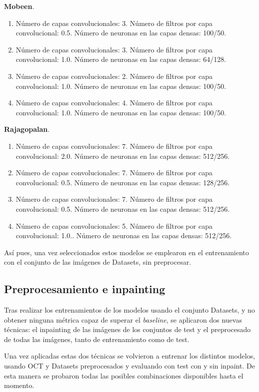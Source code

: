 \textbf{Mobeen}.
\begin{enumerate}
    \item Número de capas convolucionales: 3. Número de filtros por capa convolucional: 0.5. Número de neuronas en las capas densas: 100/50.
    \item Número de capas convolucionales: 3. Número de filtros por capa convolucional: 1.0. Número de neuronas en las capas densas: 64/128.
    \item Número de capas convolucionales: 2. Número de filtros por capa convolucional: 1.0. Número de neuronas en las capas densas: 100/50.
    \item Número de capas convolucionales: 4. Número de filtros por capa convolucional: 1.0. Número de neuronas en las capas densas: 100/50.
\end{enumerate}

\textbf{Rajagopalan}.
\begin{enumerate}
    \item Número de capas convolucionales: 7. Número de filtros por capa convolucional: 2.0. Número de neuronas en las capas densas: 512/256.
    \item Número de capas convolucionales: 7. Número de filtros por capa convolucional: 0.5. Número de neuronas en las capas densas: 128/256.
    \item Número de capas convolucionales: 7. Número de filtros por capa convolucional: 0.5. Número de neuronas en las capas densas: 512/256.
    \item Número de capas convolucionales: 5. Número de filtros por capa convolucional: 1.0.. Número de neuronas en las capas densas: 512/256.
\end{enumerate}

Así pues, una vez seleccionados estos modelos se emplearon en el entrenamiento con el conjunto de las imágenes de Datasets, sin preprocesar.

\subsection{Preprocesamiento e inpainting}

Tras realizar los entrenamientos de los modelos usando el conjunto Datasets, y no obtener ninguna métrica capaz de superar el \textit{baseline}, se aplicaron dos nuevas técnicas: el inpainting de las imágenes de los conjuntos de test y el preprocesado de todas las imágenes, tanto de entrenamiento como de test.

Una vez aplicadas estas dos técnicas se volvieron a entrenar los distintos modelos, usando OCT y Datasets preprocesados y evaluando con test con y sin inpaint. De esta manera se probaron todas las posibles combinaciones disponibles hasta el momento.

